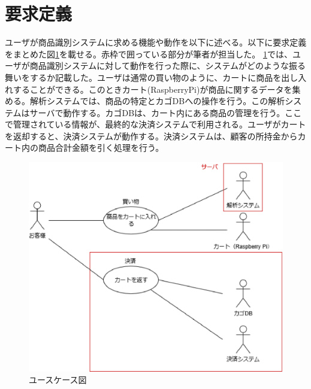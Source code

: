\section{要求定義}
ユーザが商品識別システムに求める機能や動作を以下に述べる。以下に要求定義をまとめた図\ref{usecase}を載せる。赤枠で囲っている部分が筆者が担当した。
\ref{usecase}では、ユーザが商品識別システムに対して動作を行った際に、システムがどのような振る舞いをするか記載した。ユーザは通常の買い物のように、カートに商品を出し入れすることができる。このときカート(RaspberryPi)が商品に関するデータを集める。解析システムでは、商品の特定とカゴDBへの操作を行う。この解析システムはサーバで動作する。カゴDBは、カート内にある商品の管理を行う。ここで管理されている情報が、最終的な決済システムで利用される。ユーザがカートを返却すると、決済システムが動作する。決済システムは、顧客の所持金からカート内の商品合計金額を引く処理を行う。

\begin{figure}[htbp]
\centering
\includegraphics[width=12cm]{./pic/usecase_saishu.eps}
\caption{ユースケース図}
\label{usecase}
\end{figure}